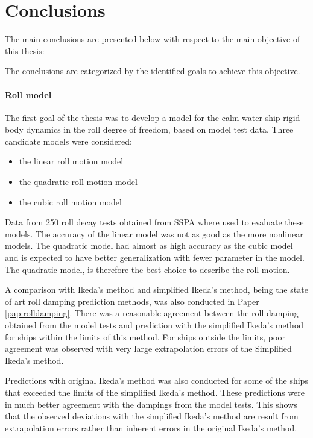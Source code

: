 \chapter{Conclusions\label{ch:conclusions}}
The main conclusions are presented below with respect to the main objective of this thesis:
\begin{quote} 
\expandafter\MakeUppercase \objective
\end{quote}
\noindent The conclusions are categorized by the identified goals to achieve this objective.

\subsubsection*{Roll model}
The first goal of the thesis was to develop a model for the calm water ship rigid body dynamics in the roll degree of freedom, based on model test data. 
Three candidate models were considered: 
\begin{itemize}
    \item the linear roll motion model
    \item the quadratic roll motion model
    \item the cubic roll motion model
\end{itemize}
\noindent Data from 250 roll decay tests obtained from SSPA where used to evaluate these models. The accuracy of the linear model was not as good as the more nonlinear models. The quadratic model had almost as high accuracy as the cubic model and is expected to have better generalization with fewer parameter in the model. The quadratic model, is therefore the best choice to describe the roll motion. 

A comparison with Ikeda's method and simplified Ikeda's method, being the state of art roll damping prediction methods, was also conducted in Paper \ref{pap:rolldamping}. There was a reasonable agreement between the roll damping obtained from the model tests and prediction with the simplified Ikeda's method for ships within the limits of this method. For ships outside the limits, poor agreement was observed with very large extrapolation errors of the Simplified Ikeda's method. 

Predictions with original Ikeda's method was also conducted for some of the ships that exceeded the limits of the simplified Ikeda's method. These predictions were in much better agreement with the dampings from the model tests. This shows that the observed deviations with the simplified Ikeda's method are result from extrapolation errors rather than inherent 
errors in the original Ikeda's method.

